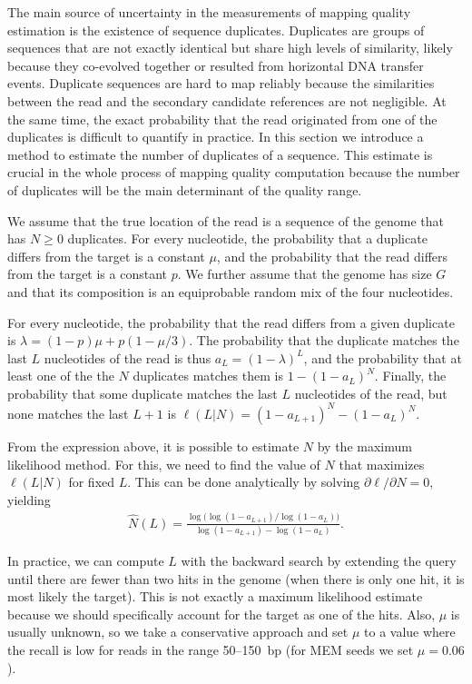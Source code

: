 \documentclass[a4,center,fleqn]{NAR}
\begin{document}
The main source of uncertainty in the measurements of mapping quality
estimation is the existence of sequence duplicates. Duplicates are groups
of sequences that are not exactly identical but share high levels of
similarity, likely because they co-evolved together or resulted from
horizontal DNA transfer events. Duplicate sequences are hard to map
reliably because the similarities between the read and the secondary
candidate references are not negligible. At the same time, the exact
probability that the read originated from one of the duplicates is
difficult to quantify in practice. In this section we introduce a method
to estimate the number of duplicates of a sequence. This estimate is
crucial in the whole process of mapping quality computation because the
number of duplicates will be the main determinant of the quality range.

We assume that the true location of the read is a sequence of the genome
that has $N \geq 0$ duplicates. For every nucleotide, the probability that
a duplicate differs from the target is a constant $\mu$, and the
probability that the read differs from the target is a constant $p$. We
further assume that the genome has size $G$ and that its composition is an
equiprobable random mix of the four nucleotides.

For every nucleotide, the probability that the read differs from a given
duplicate is $\lambda = (1-p)\mu + p(1-\mu/3)$. The probability that the
duplicate matches the last $L$ nucleotides of the read is thus $a_L =
(1-\lambda)^L$, and the probability that at least one of the the $N$
duplicates matches them is $1-(1-a_L)^N$. Finally, the probability that
some duplicate matches the last $L$ nucleotides of the read, but none
matches the last $L+1$ is $\ell(L|N) = (1-a_{L+1})^N-(1-a_L)^N.$

From the expression above, it is possible to estimate $N$ by the maximum
likelihood method. For this, we need to find the value of $N$ that
maximizes $\ell(L|N)$ for fixed $L$. This can be done analytically by
solving $\partial \ell / \partial N = 0$, yielding
\begin{align}
\label{eq_mle}
\hat{N}(L) =\frac{ \log \big( \log(1-a_{L+1}) / \log(1-a_L) \big)} {
\log(1-a_{L+1}) - \log(1-a_L) }.
\end{align}

In practice, we can compute $L$ with the backward search by extending the
query until there are fewer than two hits in the genome (when there is
only one hit, it is most likely the target). This is not exactly a maximum
likelihood estimate because we should specifically account for the target
as one of the hits. Also, $\mu$ is usually unknown, so we take a
conservative approach and set $\mu$ to a value where the recall is low for
reads in the range 50--150~bp (for MEM seeds we set $\mu = 0.06$).
\end{document}
